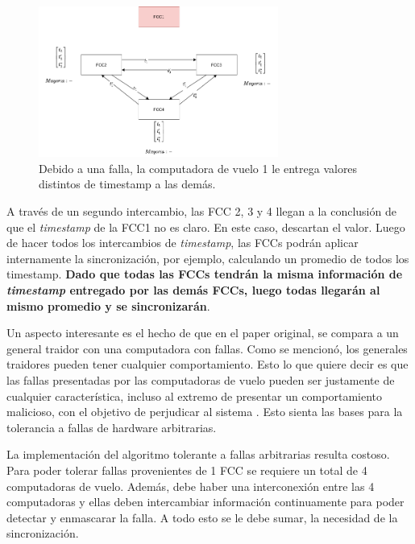 \begin{figure}[H]
    \centering
    \includegraphics[width=0.7\textwidth]{img/Byzantine_Generals_Problem_6.png}
    \caption{Debido a una falla, la computadora de vuelo 1 le entrega valores distintos de timestamp a las demás.}
    \label{fig:Byzantine_Generals_Problem_6}
\end{figure}

A través de un segundo intercambio, las FCC 2, 3 y 4 llegan a la conclusión de que el \textit{timestamp} de la FCC1 no es claro. En este caso, descartan el valor. Luego de hacer todos los intercambios de \textit{timestamp}, las FCCs podrán aplicar internamente la sincronización, por ejemplo, calculando un promedio de todos los timestamp. \textbf{Dado que todas las FCCs tendrán la misma información de \textit{timestamp} entregado por las demás FCCs, luego todas llegarán al mismo promedio y se sincronizarán}.

Un aspecto interesante es el hecho de que en el paper original, se compara a un general traidor con una computadora con fallas. Como se mencionó, los generales traidores pueden tener cualquier comportamiento. Esto lo que quiere decir es que las fallas presentadas por las computadoras de vuelo pueden ser justamente de cualquier característica, incluso al extremo de presentar un comportamiento malicioso, con el objetivo de perjudicar al sistema \cite{lala1994architectural}. Esto sienta las bases para la tolerancia a fallas de hardware arbitrarias.

La implementación del algoritmo tolerante a fallas arbitrarias resulta costoso. Para poder tolerar fallas provenientes de 1 FCC se requiere un total de 4 computadoras de vuelo. Además, debe haber una interconexión entre las 4 computadoras y ellas deben intercambiar información continuamente para poder detectar y enmascarar la falla. A todo esto se le debe sumar, la necesidad de la sincronización.